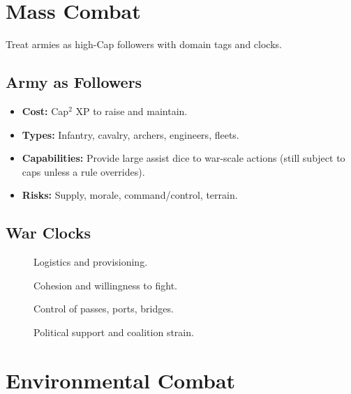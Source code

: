 \section{Mass Combat}
\label{sec:mass-combat}

Treat armies as high-Cap followers with domain tags and clocks.

\subsection{Army as Followers}
\label{subsec:army-followers}

\begin{itemize}
  \item \textbf{Cost:} Cap$^2$ XP to raise and maintain. 
  \item \textbf{Types:} Infantry, cavalry, archers, engineers, fleets.
  \item \textbf{Capabilities:} Provide large assist dice to war-scale actions (still subject to caps unless a rule overrides). 
  \item \textbf{Risks:} Supply, morale, command/control, terrain.
\end{itemize}

\subsection{War Clocks}
\label{subsec:war-clocks}

\begin{description}
  \item[] Logistics and provisioning. 
  \item[] Cohesion and willingness to fight. 
  \item[] Control of passes, ports, bridges. 
  \item[] Political support and coalition strain. 
\end{description}

\section{Environmental Combat}
\label{sec:environmental-combat}

